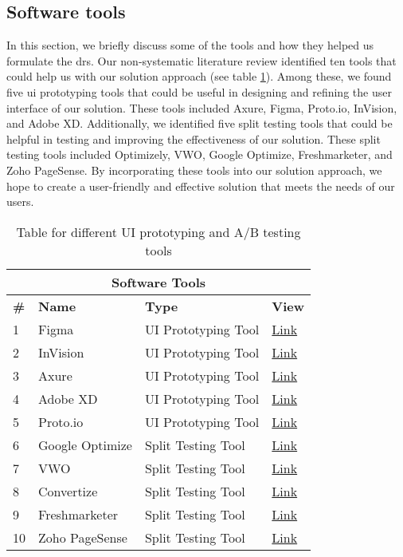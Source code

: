 \subsection*{Software tools}
\label{section:appendix:tools}
In this section, we briefly discuss some of the tools and how they helped us formulate the \ac{dr}s. 
Our non-systematic literature review identified ten tools that could help us with our solution approach (see table \ref{table:appendix:tools:review}). 
Among these, we found five \ac{ui} prototyping tools that could be useful in designing and refining the user interface of our solution. 
These tools included Axure, Figma, Proto.io, InVision, and Adobe XD. 
Additionally, we identified five split testing tools that could be helpful in testing and improving the effectiveness of our solution. 
These split testing tools included Optimizely, VWO, Google Optimize, Freshmarketer, and Zoho PageSense. 
By incorporating these tools into our solution approach, we hope to create a user-friendly and effective solution that meets the needs of our users.
\begin{table}[htbp!]
    \centering
    \begin{tabular}{| m{0.8em} || m{13em} | m{13em} | m{4em} | }
    \hline 
    \multicolumn{4}{|c|}{\textbf{Software Tools}} \\ 
    \hline
    \textbf{\#} & \textbf{Name} & \textbf{Type} & \textbf{View} \\
    \hline
    1 & Figma &  UI Prototyping Tool & \href{https://www.figma.com/}{Link} \\
    \hline 
    2 & InVision &  UI Prototyping Tool & \href{https://www.invisionapp.com/}{Link}\\
    \hline 
    3 & Axure & UI Prototyping Tool & \href{https://www.axure.com/}{Link} \\
    \hline
    4 & Adobe XD & UI Prototyping Tool & \href{https://helpx.adobe.com/support/xd.html}{Link} \\
    \hline
    5 & Proto.io & UI Prototyping Tool & \href{https://proto.io/}{Link} \\
    \hline
    6 & Google Optimize &  Split Testing Tool & \href{https://optimize.google.com/optimize/}{Link} \\
    \hline 
    7 & VWO & Split Testing Tool & \href{https://vwo.com/blog/split-testing/}{Link} \\
    \hline 
    8 & Convertize & Split Testing Tool & \href{https://www.convertize.io/}{Link}\\ 
    \hline 
    9 & Freshmarketer & Split Testing Tool & \href{https://www.freshworks.com/crm/marketing/}{Link} \\
    \hline
    10 & Zoho PageSense & Split Testing Tool & \href{https://www.zoho.com/pagesense/}{Link} \\
    \hline
    \end{tabular}
    \caption[UI Prototyping and A/B Testing Tools]{Table for different UI prototyping and A/B testing tools}
    \label{table:appendix:tools:review}
\end{table}


